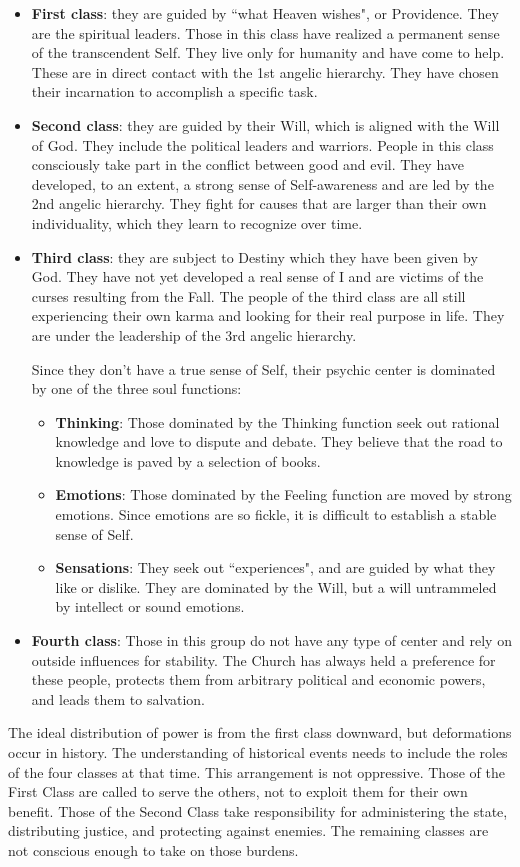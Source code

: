 \begin{itemize}
\item \textbf{First class}: they are guided by ``what Heaven wishes", or Providence. They are the spiritual leaders. Those in this class have realized a permanent sense of the transcendent Self. They live only for humanity and have come to help. These are in direct contact with the 1st angelic hierarchy. They have chosen their incarnation to accomplish a specific task. 
\item \textbf{Second class}: they are guided by their Will, which is aligned with the Will of God. They include the political leaders and warriors. People in this class consciously take part in the conflict between good and evil. They have developed, to an extent, a strong sense of Self-awareness and are led by the 2nd angelic hierarchy. They fight for causes that are larger than their own individuality, which they learn to recognize over time. 
\item \textbf{Third class}: they are subject to Destiny which they have been given by God. They have not yet developed a real sense of I and are victims of the curses resulting from the Fall. The people of the third class are all still experiencing their own karma and looking for their real purpose in life. They are under the leadership of the 3rd angelic hierarchy. 

Since they don't have a true sense of Self, their psychic center is dominated by one of the three soul functions:

\begin{itemize}
\item \textbf{Thinking}: Those dominated by the Thinking function seek out rational knowledge and love to dispute and debate. They believe that the road to knowledge is paved by a selection of books. 
\item \textbf{Emotions}: Those dominated by the Feeling function are moved by strong emotions. Since emotions are so fickle, it is difficult to establish a stable sense of Self. 
\item \textbf{Sensations}: They seek out ``experiences", and are guided by what they like or dislike. They are dominated by the Will, but a will untrammeled by intellect or sound emotions. 
\end{itemize}
\item \textbf{Fourth class}: Those in this group do not have any type of center and rely on outside influences for stability. The Church has always held a preference for these people, protects them from arbitrary political and economic powers, and leads them to salvation. 
\end{itemize}
The ideal distribution of power is from the first class downward, but deformations occur in history. The understanding of historical events needs to include the roles of the four classes at that time. This arrangement is not oppressive. Those of the First Class are called to serve the others, not to exploit them for their own benefit. Those of the Second Class take responsibility for administering the state, distributing justice, and protecting against enemies. The remaining classes are not conscious enough to take on those burdens.

